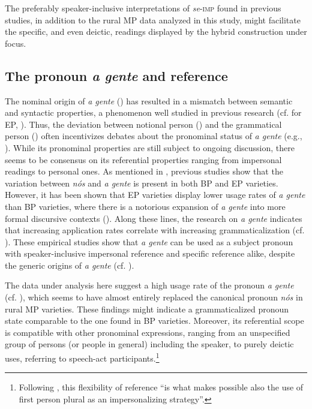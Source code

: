 \documentclass[output=paper]{langscibook}
\begin{document}
The preferably speaker-inclusive interpretations of \textit{se}-\textsc{imp} found in previous studies, in addition to the rural MP data analyzed in this study, might facilitate the specific, and even deictic, readings displayed by the hybrid construction under focus.

\subsection{The pronoun \textit{a gente} and  reference}\label{sec:henriques:4.2}

The nominal origin of \textit{a gente} (\citealt{Lopes2003,Lopes1999}) has resulted in a mismatch between semantic and syntactic properties, a phenomenon well studied in previous research (cf. for EP, \citealt{CostaPereira2013, CostaPereira2005}). Thus, the deviation between notional person () and the grammatical person () often incentivizes debates about the pronominal status of \textit{a gente} (e.g., \citealt{Taylor2009}). While its pronominal properties are still subject to ongoing discussion, there seems to be consensus on its referential properties ranging from impersonal readings to personal ones. As mentioned in , previous studies show that the variation between \textit{nós} and \textit{a gente} is present in both BP and EP varieties. However, it has been shown that EP varieties display lower usage rates of \textit{a gente} than BP varieties, where there is a notorious expansion of \textit{a gente} into more formal discursive contexts (\citealt{CallouLopes2004}). Along these lines, the research on \textit{a gente} indicates that increasing application rates correlate with increasing grammaticalization (cf.  \citealt{deOmena2003}). These empirical studies show that \textit{a gente} can be used as a subject pronoun with speaker-inclusive impersonal reference and specific reference alike, despite the generic origins of \textit{a gente} (cf.  \citealt{deOmena2003, TravisSilveira2009}). 

The data under analysis here suggest a high usage rate of the pronoun \textit{a gente} (cf. ), which seems to have almost entirely replaced the canonical pronoun \textit{nós} in rural MP varieties. These findings might indicate a grammaticalized pronoun state comparable to the one found in BP varieties. Moreover, its referential scope is compatible with other  pronominal expressions, ranging from an unspecified group of persons (or people in general) including the speaker, to purely deictic uses, referring to speech-act participants.\footnote{Following \citet[342]{Posio2012}, this flexibility of reference “is what makes possible also the use of first person plural as an impersonalizing strategy”.} 
\end{document}
